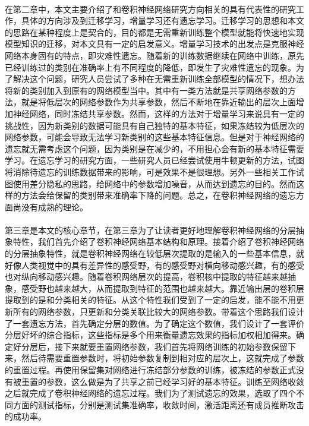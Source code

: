 \paragraph{}在第二章中，本文主要介绍了和卷积神经网络研究方向相关的具有代表性的研究工作，具体的方向涉及到迁移学习，增量学习还有遗忘学习。迁移学习的思想和本文的思路在某种程度上是契合的，目的都是无需重新训练整个模型就能将快速地实现模型知识的迁移，对本文具有一定的启发意义。增量学习技术的出发点是克服神经网络本身固有的特点，即灾难性遗忘。随着新的训练数据继续在网络中训练，原先已经训练过的类别在准确率上有不同程度的降低，即发生了灾难性遗忘的现象。为了解决这个问题，研究人员尝试了多种在无需重新训练全部模型的情况下，想办法将新的类别加入到原有的网络模型当中。其中有一类方法就是共享网络参数的方法，就是将低层次的网络参数作为共享参数，然后不断地在靠近输出的层次上面增加神经网络，同时冻结共享参数。然而，这样的方法对于增量学习来说具有一定的挑战性，因为新类别的数据可能具有自己独特的基本特征，如果冻结较为低层次的网络参数，可能会导致无法学习新类别的这些基本特征信息。但是对于神经网络的遗忘就无需考虑这个问题，因为类别是在减少的，不用担心会有新的基本特征需要学习。在遗忘学习的研究方面，一些研究人员已经尝试使用牛顿更新的方法，试图将消除待遗忘的训练数据带来的影响，可是效果不是很理想。另外一些相关工作试图使用差分隐私的思路，给网络中的参数增加噪音，从而达到遗忘的目的。然而这样的方法会给保留的类别带来准确率下降的问题。总之，在卷积神经网络的遗忘方面尚没有成熟的理论。
\paragraph{}第三章是本文的核心章节，在第三章为了让读者更好地理解卷积神经网络的分层抽象特性，我们首先介绍了卷积神经网络基本结构和原理。接着介绍了卷积神经网络的分层抽象特性，就是卷积神经网络在较低层次提取的是输入的一些基本信息，就好像人类视觉中的具有差异性的感受野，有的感受野对横向移动感兴趣，有的感受也对纵向移动感兴趣。随着卷积网络层次的提高，卷积核中提取的特征越来越抽象，感受野也越来越大，从而提取到特征的范围也越来越大。靠近输出层的卷积层提取到的是和分类相关的特征。从这个特性我们受到了一定的启发，能不能不用更新所有的网络参数，只更新和分类关联比较大的网络参数。带着这个思路我们设计了一套遗忘方法，首先确定分层的数值。为了确定这个数值，我们设计了一套评价分层好坏的综合指标，这些指标是多个用来衡量遗忘效果的指标加权相加得来。确定好分层后，接下来就要重置网络参数，我们首先将网络训练的初始参数保留下来，然后待需要重置参数时，将初始参数复制到相对应的层次上，这就完成了参数的重置过程。再使用保留集对网络进行冻结部分参数的训练，被冻结的参数正式没有被重置的参数，这么做是为了共享之前已经学习好的基本特征。训练至网络收敛之后就完成了卷积神经网络的遗忘过程。我们为了测试遗忘的效果，选取了四个不同方面的测试指标，分别是测试集准确率，收敛时间，激活距离还有成员推断攻击的成功率。
